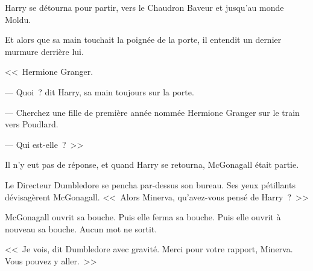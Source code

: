 Harry se détourna pour partir, vers le Chaudron Baveur et jusqu'au monde Moldu.

Et alors que sa main touchait la poignée de la porte, il entendit un dernier murmure derrière lui.

<<~Hermione Granger.

--- Quoi~? dit Harry, sa main toujours sur la porte.

--- Cherchez une fille de première année nommée Hermione Granger sur le train vers Poudlard.

--- Qui est-elle~?~>>

Il n'y eut pas de réponse, et quand Harry se retourna, McGonagall était partie.


Le Directeur Dumbledore se pencha par-dessus son bureau. Ses yeux pétillants dévisagèrent McGonagall. <<~Alors Minerva, qu'avez-vous pensé de Harry~?~>>

McGonagall ouvrit sa bouche. Puis elle ferma sa bouche. Puis elle ouvrit à nouveau sa bouche. Aucun mot ne sortit.

<<~Je vois, dit Dumbledore avec gravité. Merci pour votre rapport, Minerva. Vous pouvez y aller.~>>

